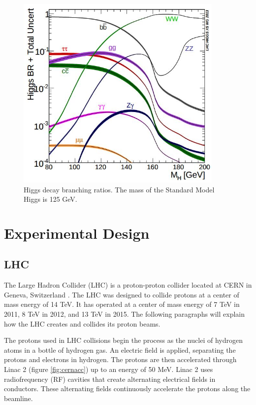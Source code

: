 \documentclass[oneside, letterpaper, oldfontcommands]{memoir}
\begin{document}
\begin{figure}[here]
\includegraphics[width=0.9\textwidth]{higgsBR.jpg}
\caption{Higgs decay branching ratios\cite{Heinemeyer:2013tqa}. The mass of the Standard Model Higgs is 125 GeV. }
\label{fig:higgsBR}
\end{figure}



\chapter{Experimental Design}\label{experiment}

\section{LHC}\label{lhc}

\qquad The Large Hadron Collider (LHC) is a proton-proton collider located at CERN in Geneva, Switzerland \cite{1748-0221-3-08-S08001}. The LHC was designed to collide protons at a center of mass energy of 14 TeV. It has operated at a center of mass energy of 7 TeV in 2011, 8 TeV in 2012, and 13 TeV in 2015. The following paragraphs will explain how the LHC creates and collides its proton beams.

\qquad The protons used in LHC collisions begin the process as the nuclei of hydrogen atoms in a bottle of hydrogen gas. An electric field is applied, separating the protons and electrons in hydrogen. The protons are then accelerated through Linac 2 (figure \ref{fig:cernacc}) up to an energy of 50 MeV. Linac 2 uses radiofrequency (RF) cavities that create alternating electrical fields in conductors. These alternating fields continuously accelerate the protons along the beamline.
\end{document}
